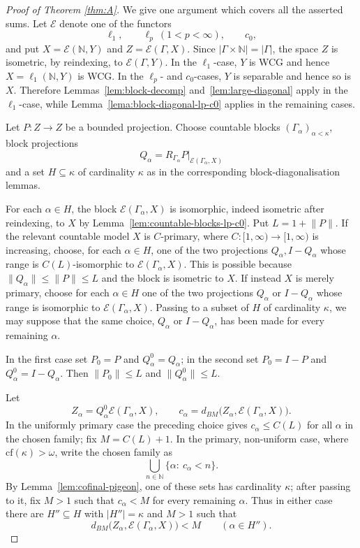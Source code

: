 \documentclass[11pt]{amsart}
\theoremstyle{plain}
\theoremstyle{definition}
\numberwithin{equation}{section}
\newcommand{\norm}[1]{\lVert #1 \rVert}
\newcommand{\abs}[1]{\left|#1\right|}
\newcommand{\N}{\mathbb{N}}
\newcommand{\cf}{\mathrm{cf}}
\renewcommand{\le}{\leqslant}
\begin{document}
\begin{proof}[Proof of Theorem \ref{thm:A}]
We give one argument which covers all the asserted sums.  Let $\mathcal E$ denote one of the functors
\[
    \ell_1,\qquad \ell_p\ (1<p<\infty),\qquad c_0,
\]
and put $X=\mathcal E(\N,Y)$ and $Z=\mathcal E(\Gamma,X)$.  Since $\abs{\Gamma\times\N}=\abs{\Gamma}$, the space $Z$ is isometric, by reindexing, to $\mathcal E(\Gamma,Y)$.  In the $\ell_1$-case, $Y$ is WCG and hence $X=\ell_1(\N,Y)$ is WCG.  In the $\ell_p$- and $c_0$-cases, $Y$ is separable and hence so is $X$.  Therefore Lemmas~\ref{lem:block-decomp} and~\ref{lem:large-diagonal} apply in the $\ell_1$-case, while Lemma~\ref{lema:block-diagonal-lp-c0} applies in the remaining cases.

Let $P\colon Z\to Z$ be a bounded projection.  Choose countable blocks $(\Gamma_\alpha)_{\alpha<\kappa}$, block projections
\[
    Q_\alpha=R_{\Gamma_\alpha}P|_{\mathcal E(\Gamma_\alpha,X)}
\]
and a set $H\subseteq\kappa$ of cardinality $\kappa$ as in the corresponding block-diagonalisation lemmas.

For each $\alpha\in H$, the block $\mathcal E(\Gamma_\alpha,X)$ is isomorphic, indeed isometric after reindexing, to $X$ by Lemma~\ref{lem:countable-blocks-lp-c0}.  Put
\(
    L=1+\norm P.
\)
If the relevant countable model $X$ is $C$-primary, where $C\colon[1,\infty)\to[1,\infty)$ is increasing, choose, for each $\alpha\in H$, one of the two projections
\(
    Q_\alpha, I-Q_\alpha
\)
whose range is $C(L)$-isomorphic to $\mathcal E(\Gamma_\alpha,X)$.  This is possible because $\norm{Q_\alpha}\le \norm P\le L$ and the block is isometric to $X$.  If instead $X$ is merely primary, choose for each $\alpha\in H$ one of the two projections $Q_\alpha$ or $I-Q_\alpha$ whose range is isomorphic to $\mathcal E(\Gamma_\alpha,X)$.  Passing to a subset of $H$ of cardinality $\kappa$, we may suppose that the same choice, $Q_\alpha$ or $I-Q_\alpha$, has been made for every remaining $\alpha$.

In the first case set $P_0=P$ and $Q_\alpha^0=Q_\alpha$; in the second set $P_0=I-P$ and $Q_\alpha^0=I-Q_\alpha$.  Then $\norm{P_0}\le L$ and $\norm{Q_\alpha^0}\le L$.

Let
\[
    Z_\alpha=Q_\alpha^0\mathcal E(\Gamma_\alpha,X),
    \qquad
    c_\alpha=d_{BM}\bigl(Z_\alpha,\mathcal E(\Gamma_\alpha,X)\bigr).
\]
In the uniformly primary case the preceding choice gives $c_\alpha\le C(L)$ for all $\alpha$ in the chosen family; fix
\(
    M=C(L)+1.
\)
In the primary, non-uniform case, where $\cf(\kappa)>\omega$, write the chosen family as
\[
    \bigcup_{n\in\N}\{\alpha:\ c_\alpha<n\}.
\]
By Lemma~\ref{lem:cofinal-pigeon}, one of these sets has cardinality $\kappa$; after passing to it, fix $M>1$ such that $c_\alpha<M$ for every remaining $\alpha$.  Thus in either case there are $H''\subseteq H$ with $\abs{H''}=\kappa$ and $M>1$ such that
\begin{equation}\label{eq:uniform-block-BM}
    d_{BM}\bigl(Z_\alpha,\mathcal E(\Gamma_\alpha,X)\bigr)<M
    \qquad(\alpha\in H'').
\end{equation}


\end{proof}
\end{document}
